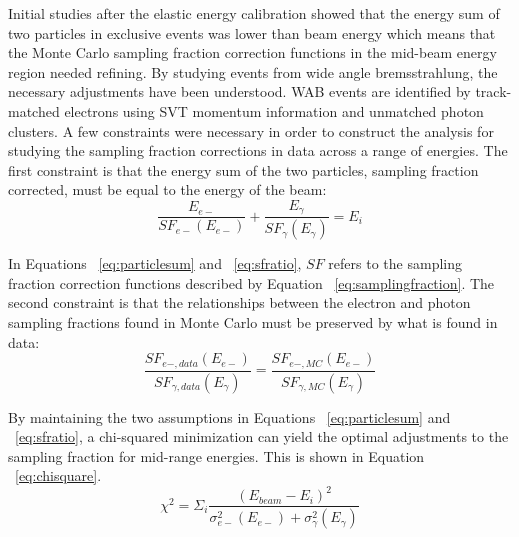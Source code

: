 \documentclass[twoside]{article}
\begin{document}
\begin{multicols}{2}
Initial studies after the elastic energy calibration showed that the energy sum of two particles in exclusive events was   lower than beam energy which means that the Monte Carlo sampling fraction correction functions in the mid-beam energy region needed refining. By studying events from wide angle bremsstrahlung, the necessary adjustments have been understood. WAB events are identified by track-matched electrons using SVT momentum information and unmatched photon clusters. 
	A few constraints were necessary in order to construct the analysis for studying the sampling fraction corrections in data across a range of energies. The first constraint is that the energy sum of the two particles, sampling fraction corrected, must be equal to the energy of the beam:
\begin{equation}
\label{eq:particlesum}
\dfrac{E_{e-}}{SF_{e-}(E_{e-})} + \dfrac{E_{\gamma}}{SF_{\gamma}(E_{\gamma})} = E_{i}
\end{equation}		
	
In Equations ~\eqref{eq:particlesum} and ~\eqref{eq:sfratio}, $SF$ refers to the sampling fraction correction functions described by Equation ~\ref{eq:samplingfraction}. The second constraint is that the relationships between the electron and photon sampling fractions found in Monte Carlo must be preserved by what is found in data:
\begin{equation}
\label{eq:sfratio}
\dfrac{SF_{e-,data}(E_{e-})}{SF_{\gamma,data}(E_{\gamma})} = \dfrac{SF_{e-,MC}(E_{e-})}{SF_{\gamma,MC}(E_{\gamma})}
\end{equation}

By maintaining the two assumptions in Equations ~\eqref{eq:particlesum} and ~\eqref{eq:sfratio}, a chi-squared minimization can yield the optimal adjustments to the sampling fraction for mid-range energies. This is shown in Equation ~\ref{eq:chisquare}.
\begin{equation}
\label{eq:chisquare}
\chi^2 = \Sigma_i \dfrac{(E_{beam}-E_{i})^2}{\sigma_{e-}^2(E_{e-})+\sigma_{\gamma}^2(E_{\gamma})}
\end{equation}


\end{multicols}
\end{document}
